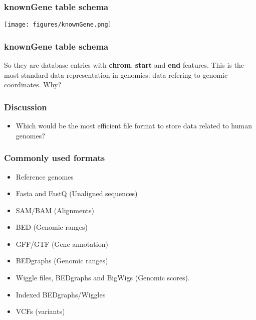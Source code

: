 \documentclass{beamer}
\begin{document}
  \begin{frame}
    \frametitle{knownGene table schema}
\texttt{[image: figures/knownGene.png]}

  \end{frame}


  \begin{frame}
    \frametitle{knownGene table schema}

So they are database entries with \textbf{chrom}, \textbf{start} and \textbf{end} features. This is the most standard data representation in genomics: data refering to genomic coordinates. Why?

  \end{frame}



  \begin{frame}
    \frametitle{Discussion}
    \begin{itemize}
    \item Which would be the most efficient file format to store data related to human genomes?

    \end{itemize}

  \end{frame}








\begin{frame}
  \frametitle{Commonly used formats}
  \begin{itemize}

  \item  Reference genomes

  \item  Fasta and FastQ (Unaligned sequences)
 
  \item SAM/BAM (Alignments)
 
  \item BED (Genomic ranges)
 
  \item GFF/GTF (Gene annotation)
 
  \item BEDgraphs (Genomic ranges)
 
  \item Wiggle files, BEDgraphs and BigWigs (Genomic scores).
 
  \item Indexed BEDgraphs/Wiggles

  \item VCFs (variants)

  \end{itemize}
\end{frame}
\end{document}
